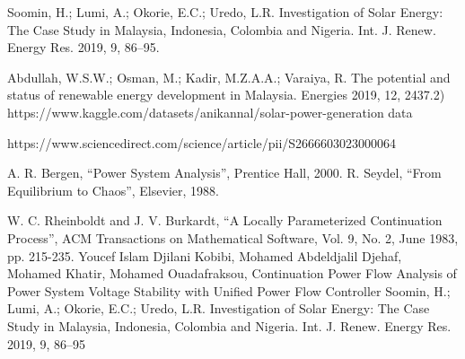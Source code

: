\documentclass[12pt,a4paper]{report}
\begin{document}
\begin{enumerate}[{[1]}]
    
   \item Soomin, H.; Lumi, A.; Okorie, E.C.; Uredo, L.R. Investigation of Solar Energy: The Case Study in Malaysia, Indonesia, Colombia and Nigeria. Int. J. Renew. Energy Res. 2019, 9, 86–95.  
   
  	\item Abdullah, W.S.W.; Osman, M.; Kadir, M.Z.A.A.; Varaiya, R. The potential and status of renewable energy development in Malaysia. Energies 2019, 12, 2437.2) https://www.kaggle.com/datasets/anikannal/solar-power-generation data
   
    \item https://www.sciencedirect.com/science/article/pii/S2666603023000064   

 A. R. Bergen, “Power System Analysis”, Prentice Hall, 2000.
R. Seydel, “From Equilibrium to Chaos”, Elsevier, 1988.  

 W. C. Rheinboldt and J. V. Burkardt, “A Locally Parameterized Continuation Process”, ACM 
Transactions on Mathematical Software, Vol. 9, No. 2, June 1983, pp. 215-235. 
Youcef Islam Djilani Kobibi, Mohamed Abdeldjalil Djehaf, Mohamed Khatir, Mohamed 
Ouadafraksou, Continuation Power Flow Analysis of Power System Voltage Stability with Unified 
Power Flow Controller
Soomin, H.; Lumi, A.; Okorie, E.C.; Uredo, L.R. Investigation of Solar Energy: The Case Study in Malaysia, Indonesia, Colombia and Nigeria. Int. J. Renew. Energy Res. 2019, 9, 86–95
\end{enumerate}
 
\end{document}
